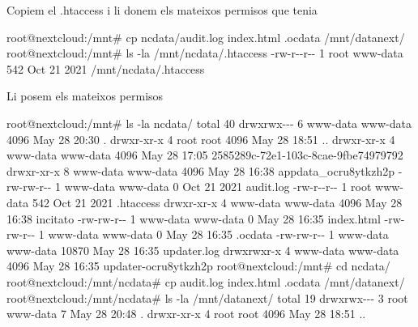 \documentclass[
  10pt,
]{krantz}
\newenvironment{Shaded}{\begin{snugshade}}{\end{snugshade}}
\newcommand{\AttributeTok}[1]{\textcolor[rgb]{0.77,0.63,0.00}{#1}}
\newcommand{\ExtensionTok}[1]{#1}
\newcommand{\NormalTok}[1]{#1}
\begin{document}
Copiem el .htaccess i li donem els mateixos permisos que tenia

\begin{Shaded}
\begin{Highlighting}[]
\ExtensionTok{root@nextcloud:/mnt\#}\NormalTok{ cp ncdata/audit.log index.html .ocdata /mnt/datanext/}
\ExtensionTok{root@nextcloud:/mnt\#}\NormalTok{ ls }\AttributeTok{{-}la}\NormalTok{ /mnt/ncdata/.htaccess }
\ExtensionTok{{-}rw{-}r{-}{-}r{-}{-}}\NormalTok{ 1 root www{-}data 542 Oct 21  2021 /mnt/ncdata/.htaccess}
\end{Highlighting}
\end{Shaded}

Li posem els mateixos permisos

\begin{Shaded}
\begin{Highlighting}[]
\ExtensionTok{root@nextcloud:/mnt\#}\NormalTok{ ls }\AttributeTok{{-}la}\NormalTok{ ncdata/}
\ExtensionTok{total}\NormalTok{ 40}
\ExtensionTok{drwxrwx{-}{-}{-}}\NormalTok{ 6 www{-}data www{-}data  4096 May 28 20:30 .}
\ExtensionTok{drwxr{-}xr{-}x}\NormalTok{ 4 root     root      4096 May 28 18:51 ..}
\ExtensionTok{drwxr{-}xr{-}x}\NormalTok{ 4 www{-}data www{-}data  4096 May 28 17:05 2585289c{-}72e1{-}103c{-}8cae{-}9fbe74979792}
\ExtensionTok{drwxr{-}xr{-}x}\NormalTok{ 8 www{-}data www{-}data  4096 May 28 16:38 appdata\_ocru8ytkzh2p}
\ExtensionTok{{-}rw{-}rw{-}r{-}{-}}\NormalTok{ 1 www{-}data www{-}data     0 Oct 21  2021 audit.log}
\ExtensionTok{{-}rw{-}r{-}{-}r{-}{-}}\NormalTok{ 1 root     www{-}data   542 Oct 21  2021 .htaccess}
\ExtensionTok{drwxr{-}xr{-}x}\NormalTok{ 4 www{-}data www{-}data  4096 May 28 16:38 incitato}
\ExtensionTok{{-}rw{-}rw{-}r{-}{-}}\NormalTok{ 1 www{-}data www{-}data     0 May 28 16:35 index.html}
\ExtensionTok{{-}rw{-}rw{-}r{-}{-}}\NormalTok{ 1 www{-}data www{-}data     0 May 28 16:35 .ocdata}
\ExtensionTok{{-}rw{-}rw{-}r{-}{-}}\NormalTok{ 1 www{-}data www{-}data 10870 May 28 16:35 updater.log}
\ExtensionTok{drwxrwxr{-}x}\NormalTok{ 4 www{-}data www{-}data  4096 May 28 16:35 updater{-}ocru8ytkzh2p}
\ExtensionTok{root@nextcloud:/mnt\#}\NormalTok{ cd ncdata/}
\ExtensionTok{root@nextcloud:/mnt/ncdata\#}\NormalTok{ cp audit.log index.html .ocdata /mnt/datanext/}
\ExtensionTok{root@nextcloud:/mnt/ncdata\#}\NormalTok{ ls }\AttributeTok{{-}la}\NormalTok{ /mnt/datanext/}
\ExtensionTok{total}\NormalTok{ 19}
\ExtensionTok{drwxrwx{-}{-}{-}}\NormalTok{ 3 root     www{-}data    7 May 28 20:48 .}
\ExtensionTok{drwxr{-}xr{-}x}\NormalTok{ 4 root     root     4096 May 28 18:51 ..}

\end{Highlighting}
\end{Shaded}
\end{document}
